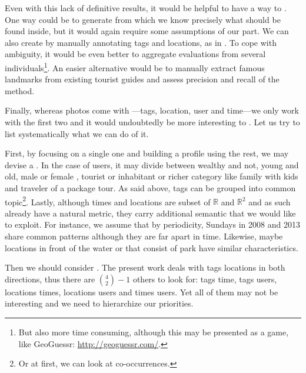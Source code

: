 Even with this lack of definitive results, it would be helpful to have a way
to . One way could be to generate
 from which we know precisely what should be found
inside, but it would again require some assumptions of our part. We can also
create  by manually annotating tags and
locations, as in \cite{Rattenbury2009}. To cope with ambiguity, it would be
even better to aggregate evaluations from several individuals\footnote{But
also more time consuming, although this may be presented as a game, like
GeoGuessr: \url{http://geoguessr.com/}.}. An easier alternative would be to
manually extract famous landmarks from existing tourist guides and assess
precision and recall of the method.

\medskip

Finally, whereas photos come with —tags, location, user and time—we only work with the first two
and it would undoubtedly be more interesting to .
Let us try to list systematically what we can do of it.

First, by focusing on a single one and building a profile using the rest, we
may devise a .
In the case of users, it may divide between wealthy and not, young and old,
male or female \cite{gender}, tourist or inhabitant or richer category like
family with kids and traveler of a package tour. As said above, tags can be
grouped into common topic\footnote{Or at first, we can look at
co-occurrences.}. Lastly, although times and locations are subset of
$\mathbb{R}$ and $\mathbb{R}^2$ and as such already have a natural metric,
they carry additional semantic that we would like to exploit. For instance, we
assume that by periodicity, Sundays in 2008 and 2013 share common patterns
although they are far apart in time. Likewise, maybe locations in front of the
water or that consist of park have similar characteristics.

Then we should consider . The present work deals
with tags \texrel locations in both directions, thus there are $\binom{4}{2} -
1$ others to look for: tags \texrel time, tags \texrel users, locations \texrel
times, locations \texrel users and times \texrel users. Yet all of them may
not be interesting and we need to hierarchize our priorities. 
